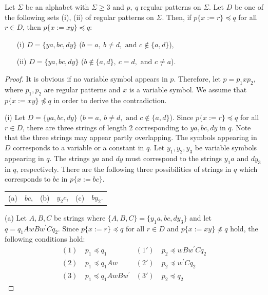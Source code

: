 \begin{lem}\label{片方}
Let $\Sigma$ be an alphabet with $\Sigma \ge 3$ and $p,~q$ regular patterns on $\Sigma$.
Let $D$ be one of the following sets \textrm{(i), (ii)} of regular patterns on $\Sigma$.
Then, if $p \{ x := r \} \preceq q$ for all $r \in D$, then $p \{ x := xy \} \preceq q$:
\begin{enumerate}
\item[{\rm (i)}] $D=\{ ya, bc, dy \}$ ($b = a,~b \not= d,\mbox{~and~}c \not\in \{a,d\}$),
\item[{\rm (ii)}] $D=\{ ya, bc, dy \}$ ($b \not\in \{a,d\},~c = d,\mbox{~and~} c \not = a$).
\end{enumerate}
\end{lem}

\begin{proof}
  It is obvious if no variable symbol appears in $p$.
  Therefore, let $p=p_{1}xp_{2}$, where $p_{1}, p_{2}$ are regular patterns and $x$ is a variable symbol. We assume that $p \{ x := xy \} \not \preceq q$ in order to derive the contradiction.
  
\noindent\textrm{(i)}
Let $D=\{ ya, bc, dy \}$ ($b = a,~b \not= d,\mbox{~and~}c \not\in \{a,d\}$).
Since $p \{ x := r \} \preceq q$ for all $r \in D$, there are three strings of length $2$ corresponding to $ya, bc, dy$ in $q$. Note that the three strings may appear partly overlapping.
The symbols appearing in $D$ corresponds to a variable or a constant in $q$.
Let $y_{1}, y_{2}, y_{3}$ be variable symbols appearing in $q$.
The strings $ya$ and $dy$ must correspond to the strings $y_{1}a$ and $dy_{3}$ in $q$, respectively.
There are the following three possibilities of strings in $q$ which corresponds to $bc$ in $p\{x:=bc\}$.
\begin{center}
\begin{tabular}{cccccc}
\textrm{(a)} & $bc$, &
\textrm{(b)} & $y_{2}c$, &
\textrm{(c)} & $by_{2}$.
\end{tabular}
\end{center}

\textrm{(a)}
Let $A,B,C$ be strings where $\{ A,B,C \} = \{ y_{1}a,bc,dy_{3} \}$ and let $q=q_{1}AwBw^{\prime}Cq_{2}$.
Since $p \{ x := r \} \preceq q$ for all $r \in D$ and $p \{ x := xy \} \not \preceq q$ hold, the following conditions hold:
\begin{align*}
(1)~& p_{1} \preceq q_{1} & (1')~& p_{2} \preceq wBw^{\prime}Cq_{2} \\
(2)~& p_{1} \preceq q_{1}Aw & (2')~& p_{2} \preceq w^{\prime}Cq_{2} \\
(3)~& p_{1} \preceq q_{1}AwBw^{\prime} & (3')~& p_{2} \preceq q_{2}
\end{align*}


\end{proof}
